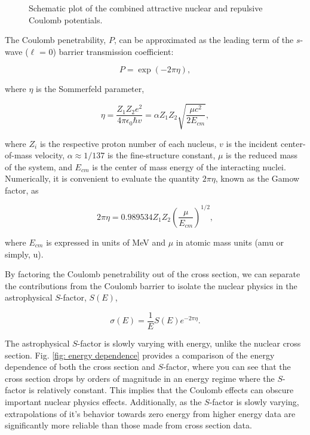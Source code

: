 \begin{figure}
\label{fig: potentials}
\caption{Schematic  plot of the combined attractive nuclear and repulsive Coulomb potentials. }
\end{figure}

The Coulomb penetrability, $P$, can be approximated as the leading term of the $s$-wave ($\ell$ = 0) barrier transmission coefficient:

\begin{equation}
P = \exp(-2\pi\eta),
\end{equation}

\noindent where $\eta$ is the Sommerfeld parameter,

\begin{equation}
\eta = \dfrac{Z_{1}Z_{2}e^{2}}{4 \pi \epsilon_{0} \hbar v} = \alpha Z_{1} Z_{2} \sqrt{\dfrac{\mu c^{2}}{2E_{cm}}},
\end{equation}

\noindent where $Z_{i}$ is the respective proton number of each nucleus, $v$ is the incident center-of-mass velocity, $\alpha \approx 1/137$ is the fine-structure constant, $\mu$ is the reduced mass of the system, and $E_{cm}$ is the center of mass energy of the interacting nuclei. Numerically, it is convenient to evaluate the quantity $2\pi \eta$, known as the Gamow factor, as

\begin{equation}
2\pi \eta = 0.989534 Z_{1} Z_{2} \left( \dfrac{\mu}{E_{cm}} \right)^{1/2}, 
\label{eqn: gamow factor}
\end{equation}

\noindent where $E_{cm}$ is expressed in units of MeV and $\mu$ in atomic mass units (amu or simply, u). 

By factoring the Coulomb penetrability out of the cross section, we can separate the contributions from the Coulomb barrier to isolate the nuclear physics in the astrophysical $S$-factor, $S(E)$, 

\begin{equation}
\sigma(E) = \dfrac{1}{E} S(E) e^{-2\pi \eta}.
\label{eqn: s-factor definition}
\end{equation}

\noindent The astrophysical $S$-factor is slowly varying with energy, unlike the nuclear cross section. Fig. \ref{fig: energy dependence} provides a comparison of the energy dependence of both the cross section and $S$-factor, where you can see that the cross section drops by orders of magnitude in an energy regime where the $S$-factor is relatively constant. This implies that the Coulomb effects can obscure important nuclear physics effects. Additionally, as the $S$-factor is slowly varying, extrapolations of it's behavior towards zero energy from higher energy data are significantly more reliable than those made from cross section data. 

